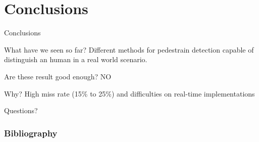 \section{Conclusions}

\begin{frame}[plain]
\end{frame}

\begin{frame}{Conclusions}
  \begin{exampleblock}{What have we seen so far?}
    Different methods for pedestrain detection capable of distinguish an human
    in a real world scenario.
  \end{exampleblock}
\pause
  \begin{alertblock}{Are these result good enough?}
    \centering\huge NO
  \end{alertblock}
  \pause
    \begin{alertblock}{Why?}
      High miss rate (15\% to 25\%) and difficulties on real-time implementations
    \end{alertblock}
\end{frame}

\begin{frame}[standout]
  \huge Questions?
\end{frame}


\begin{frame}[allowframebreaks] %

\frametitle{Bibliography}
\small
\scriptsize{}
\scriptsize
\nocite{*}
\end{frame}
